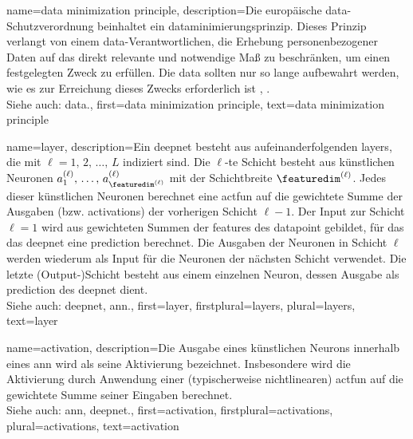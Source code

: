 {{{{
{name={data minimization principle},
	description={Die europäische \gls{data}-Schutzverordnung 
		beinhaltet ein \gls{data}minimierungsprinzip. Dieses Prinzip verlangt von einem \gls{data}-Verantwortlichen, 
		die Erhebung personenbezogener Daten auf das direkt relevante und notwendige Maß zu beschränken, 
		um einen festgelegten Zweck zu erfüllen. Die \gls{data} sollten nur so lange aufbewahrt werden, 
		wie es zur Erreichung dieses Zwecks erforderlich ist \cite[Artikel 5(1)(c)]{GDPR2016}, \cite{EURegulation2018}.
				\\
		Siehe auch: \gls{data}.}, 
	first={data minimization principle},
	text={data minimization principle}
}

{name={layer},
	description={Ein \gls{deepnet} besteht aus aufeinanderfolgenden \glspl{layer}, die mit
	 $\ell=1,\,2,\,\ldots,\,L$ indiziert sind. Die $\ell$-te Schicht besteht aus künstlichen
	  Neuronen $a^{(\ell)}_{1},\,\ldots,\,a^{(\ell)}_{\featuredim^{(\ell)}}$ mit der Schichtbreite
	   $\featuredim^{(\ell)}$. Jedes dieser künstlichen Neuronen berechnet eine \gls{actfun} auf die 
	   gewichtete Summe der Ausgaben (bzw. \glspl{activation}) der vorherigen Schicht $\ell-1$. Der Input 
	   zur Schicht $\ell=1$ wird aus gewichteten Summen der \glspl{feature} des \gls{datapoint} gebildet,
	    für das das \gls{deepnet} eine \gls{prediction} berechnet. Die Ausgaben der Neuronen in Schicht $\ell$ 
		werden wiederum als Input für die Neuronen der nächsten Schicht verwendet. Die letzte (Output-)Schicht
		 besteht aus einem einzelnen Neuron, dessen Ausgabe als \gls{prediction} des \gls{deepnet} dient.  
		\\
		Siehe auch: \gls{deepnet}, \gls{ann}.}, 
	first={layer},
	firstplural={layers},
	plural={layers}, 
	text={layer}
}

{name={activation},
	description={Die Ausgabe eines künstlichen Neurons innerhalb eines \gls{ann} wird als seine
	 Aktivierung bezeichnet. Insbesondere wird die Aktivierung durch Anwendung einer (typischerweise nichtlinearen)
	  \gls{actfun} auf die gewichtete Summe seiner Eingaben berechnet.
		\\
		Siehe auch: \gls{ann}, \gls{deepnet}.}, 
	first={activation},
	firstplural={activations},
	plural={activations}, 
	text={activation}
}

}}}}
